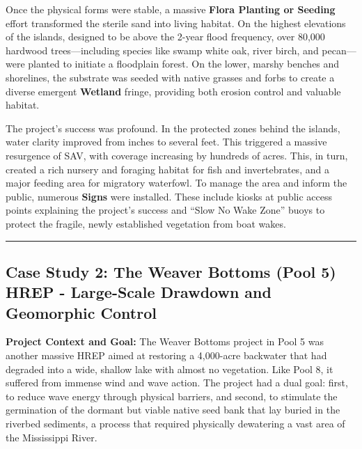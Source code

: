 \documentclass[
  letterpaper,
  DIV=11,
  numbers=noendperiod]{scrreprt}
\begin{document}
Once the physical forms were stable, a massive \textbf{Flora Planting or
Seeding} effort transformed the sterile sand into living habitat. On the
highest elevations of the islands, designed to be above the 2-year flood
frequency, over 80,000 hardwood trees---including species like swamp
white oak, river birch, and pecan---were planted to initiate a
floodplain forest. On the lower, marshy benches and shorelines, the
substrate was seeded with native grasses and forbs to create a diverse
emergent \textbf{Wetland} fringe, providing both erosion control and
valuable habitat.

The project's success was profound. In the protected zones behind the
islands, water clarity improved from inches to several feet. This
triggered a massive resurgence of SAV, with coverage increasing by
hundreds of acres. This, in turn, created a rich nursery and foraging
habitat for fish and invertebrates, and a major feeding area for
migratory waterfowl. To manage the area and inform the public, numerous
\textbf{Signs} were installed. These include kiosks at public access
points explaining the project's success and ``Slow No Wake Zone'' buoys
to protect the fragile, newly established vegetation from boat wakes.

\begin{center}\rule{0.5\linewidth}{0.5pt}\end{center}

\subsection{\texorpdfstring{\textbf{Case Study 2: The Weaver Bottoms
(Pool 5) HREP - Large-Scale Drawdown and Geomorphic
Control}}{Case Study 2: The Weaver Bottoms (Pool 5) HREP - Large-Scale Drawdown and Geomorphic Control}}\label{case-study-2-the-weaver-bottoms-pool-5-hrep---large-scale-drawdown-and-geomorphic-control}

\textbf{Project Context and Goal:} The Weaver Bottoms project in Pool 5
was another massive HREP aimed at restoring a 4,000-acre backwater that
had degraded into a wide, shallow lake with almost no vegetation. Like
Pool 8, it suffered from immense wind and wave action. The project had a
dual goal: first, to reduce wave energy through physical barriers, and
second, to stimulate the germination of the dormant but viable native
seed bank that lay buried in the riverbed sediments, a process that
required physically dewatering a vast area of the Mississippi River.
\end{document}

